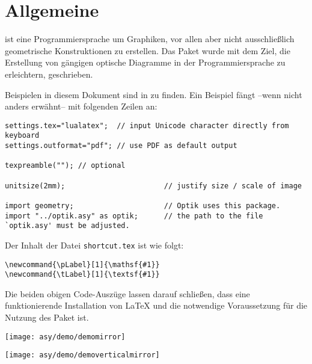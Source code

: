 \chapter{Allgemeine}

\asypmtote\cite{Asymptote} ist eine Programmiersprache um Graphiken, vor allen aber nicht ausschließlich geometrische Konstruktionen zu erstellen.
Das Paket \optik{} wurde mit dem Ziel, die Erstellung von gängigen optische Diagramme in der Programmiersprache \asypmtote{} zu erleichtern, geschrieben.


Beispielen in diesem Dokument sind in \repo{} zu finden. 
Ein Beispiel fängt --wenn nicht anders erwähnt-- mit folgenden Zeilen an:

\begin{verbatim}
settings.tex="lualatex";  // input Unicode character directly from keyboard
settings.outformat="pdf"; // use PDF as default output

texpreamble(""); // optional

unitsize(2mm);                       // justify size / scale of image

import geometry;                     // Optik uses this package.
import "../optik.asy" as optik;      // the path to the file `optik.asy' must be adjusted.
\end{verbatim}


Der Inhalt der Datei \verb|shortcut.tex| ist wie folgt:

\begin{verbatim}
\newcommand{\pLabel}[1]{\mathsf{#1}}
\newcommand{\tLabel}[1]{\textsf{#1}}
\end{verbatim}


Die beiden obigen Code-Auszüge lassen darauf schließen, 
dass eine funktionierende Installation von \LaTeX{} und \asypmtote{} die notwendige Voraussetzung für die Nutzung des Paket \optik{} ist.


\texttt{[image: asy/demo/demomirror]}

\texttt{[image: asy/demo/demoverticalmirror]}


